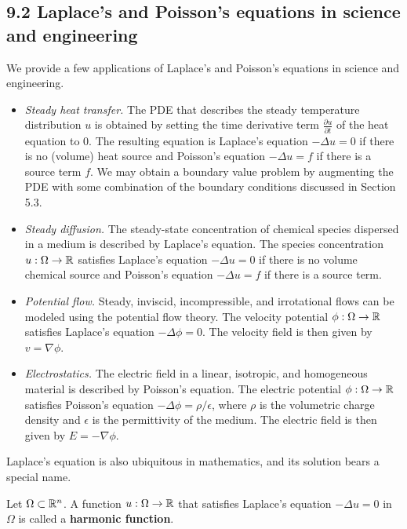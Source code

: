 \subsection{9.2 Laplace's and Poisson's equations in science and engineering}
We provide a few applications of Laplace's and Poisson's equations in science and engineering.
\begin{itemize}
    \item \textit{Steady heat transfer.} The PDE that describes the steady temperature distribution $u$ is obtained by setting the time derivative term $\frac{\partial u}{\partial t}$ of the heat equation to 0. The resulting equation is Laplace's equation $-\Delta u = 0$ if there is no (volume) heat source and Poisson's equation $-\Delta u = f$ if there is a source term $f$. We may obtain a boundary value problem by augmenting the PDE with some combination of the boundary conditions discussed in Section 5.3.
    \item \textit{Steady diffusion.} The steady-state concentration of chemical species dispersed in a medium is described by Laplace's equation. The species concentration $u : \Omega \to \mathbb{R}$ satisfies Laplace's equation $-\Delta u = 0$ if there is no volume chemical source and Poisson's equation $-\Delta u = f$ if there is a source term.
    \item \textit{Potential flow.} Steady, inviscid, incompressible, and irrotational flows can be modeled using the potential flow theory. The velocity potential $\phi : \Omega \to \mathbb{R}$ satisfies Laplace's equation $-\Delta\phi = 0$. The velocity field is then given by $v = \nabla\phi$.
    \item \textit{Electrostatics.} The electric field in a linear, isotropic, and homogeneous material is described by Poisson's equation. The electric potential $\phi : \Omega \to \mathbb{R}$ satisfies Poisson's equation $-\Delta\phi = \rho/\epsilon$, where $\rho$ is the volumetric charge density and $\epsilon$ is the permittivity of the medium. The electric field is then given by $E = -\nabla\phi$.
\end{itemize}
Laplace's equation is also ubiquitous in mathematics, and its solution bears a special name.

\begin{definition}
    Let $\Omega \subset \mathbb{R}^n$. A function $u : \Omega \to \mathbb{R}$ that satisfies Laplace's equation $-\Delta u = 0$ in $\Omega$ is called a \textbf{harmonic function}.
\end{definition}

